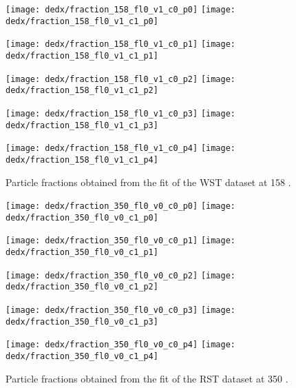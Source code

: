 \begin{figure}
  \centering
  \texttt{[image: dedx/fraction\_158\_fl0\_v1\_c0\_p0]}
  \texttt{[image: dedx/fraction\_158\_fl0\_v1\_c1\_p0]}

  \texttt{[image: dedx/fraction\_158\_fl0\_v1\_c0\_p1]}
  \texttt{[image: dedx/fraction\_158\_fl0\_v1\_c1\_p1]}

  \texttt{[image: dedx/fraction\_158\_fl0\_v1\_c0\_p2]}
  \texttt{[image: dedx/fraction\_158\_fl0\_v1\_c1\_p2]}


  \texttt{[image: dedx/fraction\_158\_fl0\_v1\_c0\_p3]}
  \texttt{[image: dedx/fraction\_158\_fl0\_v1\_c1\_p3]}

  \texttt{[image: dedx/fraction\_158\_fl0\_v1\_c0\_p4]}
  \texttt{[image: dedx/fraction\_158\_fl0\_v1\_c1\_p4]}

  \caption{Particle fractions obtained from the fit of the WST dataset at 158 \GeVc.}
  \label{fig:hadron:dedx:fit:frac158w}
\end{figure}


\begin{figure}
  \centering
  \texttt{[image: dedx/fraction\_350\_fl0\_v0\_c0\_p0]}
  \texttt{[image: dedx/fraction\_350\_fl0\_v0\_c1\_p0]}

  \texttt{[image: dedx/fraction\_350\_fl0\_v0\_c0\_p1]}
  \texttt{[image: dedx/fraction\_350\_fl0\_v0\_c1\_p1]}

  \texttt{[image: dedx/fraction\_350\_fl0\_v0\_c0\_p2]}
  \texttt{[image: dedx/fraction\_350\_fl0\_v0\_c1\_p2]}


  \texttt{[image: dedx/fraction\_350\_fl0\_v0\_c0\_p3]}
  \texttt{[image: dedx/fraction\_350\_fl0\_v0\_c1\_p3]}

  \texttt{[image: dedx/fraction\_350\_fl0\_v0\_c0\_p4]}
  \texttt{[image: dedx/fraction\_350\_fl0\_v0\_c1\_p4]}

  \caption{Particle fractions obtained from the fit of the RST dataset at 350 \GeVc.}
  \label{fig:hadron:dedx:fit:frac350r}
\end{figure}

